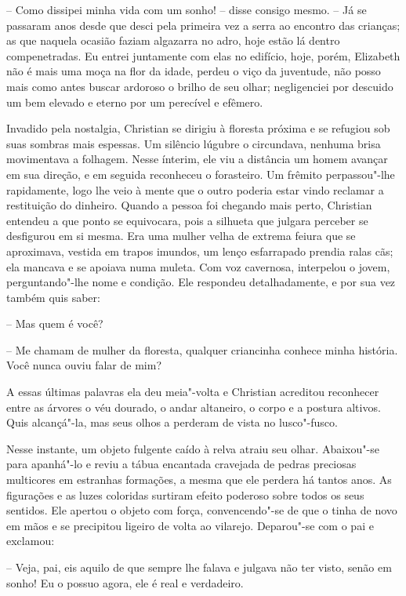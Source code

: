 -- Como dissipei minha vida com um sonho! -- disse consigo mesmo. 
-- Já se passaram anos desde que desci pela primeira vez a serra ao encontro das
crianças; as que naquela ocasião faziam algazarra no adro, hoje estão
lá dentro compenetradas. Eu entrei juntamente com elas no edifício,
hoje, porém, Elizabeth não é mais uma moça na flor da idade, perdeu o
viço da juventude, não posso mais como antes buscar ardoroso o brilho
de seu olhar; negligenciei por descuido um bem elevado e eterno por um
perecível e efêmero.

Invadido pela nostalgia, Christian se dirigiu à floresta próxima e se
refugiou sob suas sombras mais espessas. Um silêncio lúgubre o
circundava, nenhuma brisa movimentava a folhagem. Nesse ínterim, ele
viu a distância um homem avançar em sua direção, e em seguida
reconheceu o forasteiro. Um frêmito perpassou"-lhe rapidamente, logo lhe
veio à mente que o outro poderia estar vindo reclamar a restituição do
dinheiro. Quando a pessoa foi chegando mais perto, Christian entendeu a
que ponto se equivocara, pois a silhueta que julgara perceber se
desfigurou em si mesma. Era uma mulher velha de extrema feiura que se
aproximava, vestida em trapos imundos, um lenço esfarrapado prendia
ralas cãs; ela mancava e se apoiava numa muleta. Com voz cavernosa,
interpelou o jovem, perguntando"-lhe nome e condição. Ele respondeu
detalhadamente, e por sua vez também quis saber:

-- Mas quem é você?

-- Me chamam de mulher da floresta, qualquer criancinha conhece minha
história. Você nunca ouviu falar de mim?

A essas últimas palavras ela deu meia"-volta e Christian acreditou
reconhecer entre as árvores o véu dourado, o andar altaneiro, o corpo e
a postura altivos. Quis alcançá"-la, mas seus olhos a perderam de vista
no lusco"-fusco.

Nesse instante, um objeto fulgente caído à relva atraiu seu olhar.
Abaixou"-se para apanhá"-lo e reviu a tábua encantada cravejada de pedras
preciosas multicores em estranhas formações, a mesma que ele perdera há
tantos anos. As figurações e as luzes coloridas \mbox{surtiram} efeito
poderoso sobre todos os seus sentidos. Ele apertou o objeto com força,
convencendo"-se de que o tinha de novo em mãos e se precipitou ligeiro
de volta ao vilarejo. Deparou"-se com o pai e exclamou:

-- Veja, pai, eis aquilo de que sempre lhe falava e julgava não ter
visto, senão em sonho! Eu o possuo agora, ele é real e verdadeiro.


